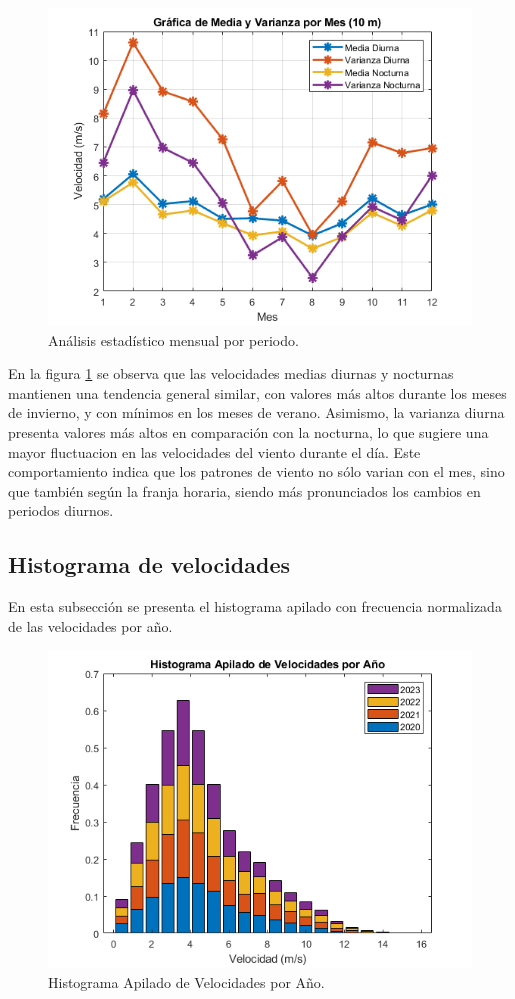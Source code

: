 \documentclass{IEEEtran}
\begin{document}
\begin{figure}[h]
    \centering
    \includegraphics[width = 0.5 \textwidth]{Imagenes/Grafica de Media y Varianza por Mes Periodo Diurno y Nocturno.png}
    \caption{Análisis estadístico mensual por periodo.}
    \label{fig: Analisis estadistico mensual por periodo}
\end{figure}

En la figura \ref{fig: Analisis estadistico mensual por periodo} se observa que las velocidades medias diurnas y nocturnas mantienen una tendencia general similar, con valores más altos durante los meses de invierno, y con mínimos en los meses de verano. Asimismo, la varianza diurna presenta valores más altos en comparación con la nocturna, lo que sugiere una mayor fluctuacion en las velocidades del viento durante el día. Este comportamiento indica que los patrones de viento no sólo varian con el mes, sino que también según la franja horaria, siendo más pronunciados los cambios en periodos diurnos.

\subsection{Histograma de velocidades}

En esta subsección se presenta el histograma apilado con frecuencia normalizada de las velocidades por año.

\begin{figure}[h]
    \centering
    \includegraphics[width = 0.5 \textwidth]{Imagenes/Histograma Apilado de Velocidades.png}
    \caption{Histograma Apilado de Velocidades por Año.}
    \label{fig: Histograma de velocidades}
\end{figure}
\end{document}
